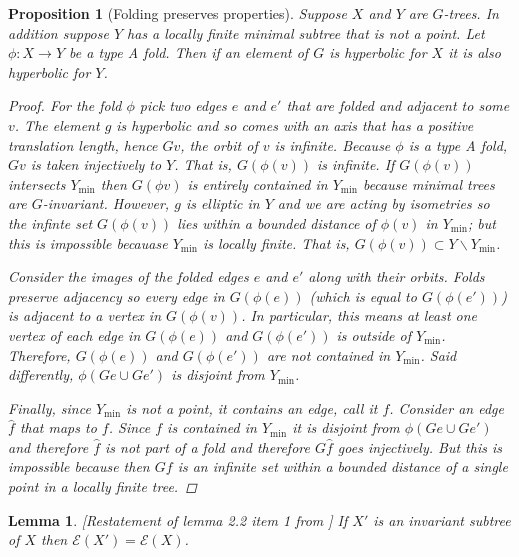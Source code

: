 \documentclass[12pt,parskip=full]{report}
\theoremstyle{plain}
\newtheorem{lem}[thm]{Lemma}
\newtheorem{prop}[thm]{Proposition}
\theoremstyle{definition}
\begin{document}
\begin{prop}
    [Folding preserves properties]
    \label{lem:foldingpreserveshyp}
    Suppose $X$ and $Y$ are $G$-trees. In addition suppose $Y$ has a locally finite minimal subtree that is not a point. Let $\phi:X\to Y$ be a type A fold. Then if an element of $G$ is hyperbolic for $X$ it is also hyperbolic for $Y$.
    
    \begin{proof}
        For the fold $\phi$ pick two edges $e$ and $e'$ that are folded and adjacent to some $v$. The element $g$ is hyperbolic and so comes with an axis that has a positive translation length, hence $Gv$, the orbit of $v$ is infinite. Because $\phi$ is a type A fold, $G v$ is taken injectively to $Y$. That is, $G(\phi (v))$ is infinite. If $G(\phi (v))$ intersects $Y_\text{min}$ then $G(\phi v)$ is entirely contained in $Y_\text{min}$ because minimal trees are $G$-invariant. However, $g$ is elliptic in $Y$ and we are acting by isometries so the infinte set $G(\phi (v))$ lies within a bounded distance of $\phi (v)$ in $Y_\text{min}$; but this is impossible becauase $Y_\text{min}$ is locally finite. That is, $G(\phi (v))\subset Y\smallsetminus Y_\text{min}$. 
        
        Consider the images of the folded edges $e$ and $e'$ along with their orbits. 
        Folds preserve adjacency so every edge in $G(\phi (e))$ (which is equal to $G(\phi (e'))$) is adjacent to a vertex in $G( \phi (v))$. In particular, this means at least one vertex of each edge in $G(\phi (e))$ and $G(\phi (e'))$ is outside of $Y_\text{min}$. 
        Therefore, $G(\phi (e))$ and $G(\phi (e'))$ are not contained in $Y_\text{min}$. 
        Said differently, $\phi( Ge\cup Ge')$ is disjoint from $Y_\text{min}$.
        
        Finally, since $Y_\text{min}$ is not a point, it contains an edge, call it $f$. Consider an edge $\hat{f}$ that maps to $f$. Since $f$ is contained in $Y_\text{min}$ it is disjoint from $\phi( Ge\cup Ge')$ and therefore $\hat{f}$ is not part of a fold and therefore \(G\hat{f}\) goes injectively. But this is impossible because then $Gf$ is an infinite set within a bounded distance of a single point in a locally finite tree.
    \end{proof}
\end{prop}

\begin{lem}
    \label{invariantell}
    [Restatement of lemma 2.2 item 1 from \cite{draftpaper}] 
    If \(X'\) is an invariant subtree of \(X\) then \(\mathcal{E}(X') = \mathcal{E}(X)\).
\end{lem}
\end{document}
